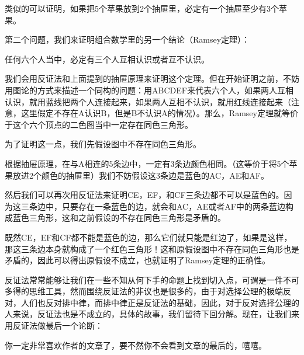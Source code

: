 \documentclass[export, 12pt, letterpaper]{ctexrep}
\newenvironment{shadedquotation}
 {\begin{shaded*}
  \quoting[leftmargin=5pt, rightmargin=5pt, vskip=0pt]
 }
 {\endquoting
 \end{shaded*}
}
\begin{document}
类似的可以证明，如果把5个苹果放到2个抽屉里，必定有一个抽屉至少有3个苹果。

第二个问题，我们来证明组合数学里的另一个结论（Ramsey定理）：

\begin{shadedquotation}
\noindent
任何六个人当中，必定有三个人互相认识或者互不认识。
\end{shadedquotation}


我们会用反证法和上面提到的抽屉原理来证明这个定理。但在开始证明之前，不妨用图论的方式来描述一个同构的问题：用ABCDEF来代表六个人，如果两人互相认识，就用蓝线把两个人连接起来，如果两人互相不认识，就用红线连接起来（注意，这里假定不存在A认识B，但是B不认识A的情况）。那么，Ramsey定理就等价于这个六个顶点的二色图当中一定存在同色三角形。

\begin{center}

\end{center}

为了证明这一点，我们先假设图中不存在同色三角形。

根据抽屉原理，在与A相连的5条边中，一定有3条边颜色相同。（这等价于将5个苹果放进2个颜色的抽屉里）我们不妨假设这3条边是蓝色的AC，AE和AF。

\begin{center}

\end{center}


然后我们可以再次用反证法来证明CE，EF，和CF三条边都不可以是蓝色的。因为这三条边中，只要存在一条蓝色的边，就会和AC，AE或者AF中的两条蓝边构成蓝色三角形，这和之前假设的不存在同色三角形是矛盾的。

既然CE，EF和CF都不能是蓝色的边，那么它们就只能是红边了，如果是这样，那这三条边本身就构成了一个红色三角形！这和原假设图中不存在同色三角形也是矛盾的，因此可以得出原假设不成立，也就证明了Ramsey定理的正确性。

\begin{center}

\end{center}

反证法常常能够让我们在一些不知从何下手的命题上找到切入点，可谓是一件不可多得的思维工具，然而围绕反证法的非议也是很多的，由于对选择公理的极端反对，人们也反对排中律，而排中律正是反证法的基础，因此，对于反对选择公理的人来说，反证法也是不成立的，具体的故事，我们留待下回分解。现在，让我们来用反证法做最后一个论断：

\begin{shadedquotation}
\noindent
你一定非常喜欢作者的文章了，要不然你不会看到文章的最后的，嘻嘻。
\end{shadedquotation}
\end{document}
